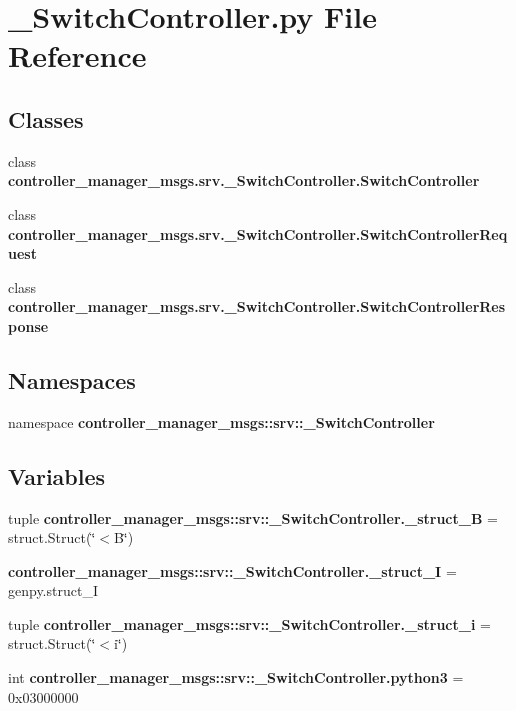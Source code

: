 \section{\-\_\-\-Switch\-Controller.\-py \-File \-Reference}
\label{__SwitchController_8py}
\subsection*{\-Classes}
\begin{DoxyCompactItemize}
\item 
class {\bf controller\-\_\-manager\-\_\-msgs.\-srv.\-\_\-\-Switch\-Controller.\-Switch\-Controller}
\item 
class {\bf controller\-\_\-manager\-\_\-msgs.\-srv.\-\_\-\-Switch\-Controller.\-Switch\-Controller\-Request}
\item 
class {\bf controller\-\_\-manager\-\_\-msgs.\-srv.\-\_\-\-Switch\-Controller.\-Switch\-Controller\-Response}
\end{DoxyCompactItemize}
\subsection*{\-Namespaces}
\begin{DoxyCompactItemize}
\item 
namespace {\bf controller\-\_\-manager\-\_\-msgs\-::srv\-::\-\_\-\-Switch\-Controller}
\end{DoxyCompactItemize}
\subsection*{\-Variables}
\begin{DoxyCompactItemize}
\item 
tuple {\bf controller\-\_\-manager\-\_\-msgs\-::srv\-::\-\_\-\-Switch\-Controller.\-\_\-struct\-\_\-\-B} = struct.\-Struct(\char`\"{}$<$\-B\char`\"{})
\item 
{\bf controller\-\_\-manager\-\_\-msgs\-::srv\-::\-\_\-\-Switch\-Controller.\-\_\-struct\-\_\-\-I} = genpy.\-struct\-\_\-\-I
\item 
tuple {\bf controller\-\_\-manager\-\_\-msgs\-::srv\-::\-\_\-\-Switch\-Controller.\-\_\-struct\-\_\-i} = struct.\-Struct(\char`\"{}$<$i\char`\"{})
\item 
int {\bf controller\-\_\-manager\-\_\-msgs\-::srv\-::\-\_\-\-Switch\-Controller.\-python3} = 0x03000000
\end{DoxyCompactItemize}

